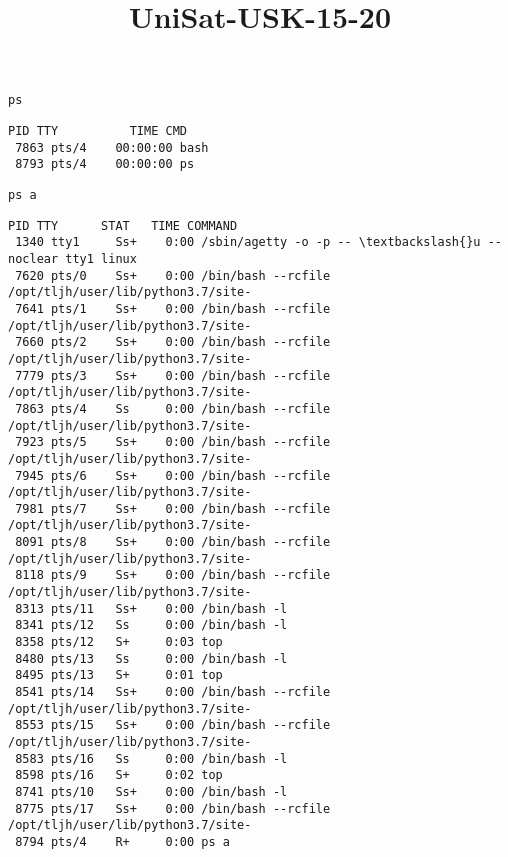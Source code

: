 \documentclass[11pt]{article}
\title{UniSat-USK-15-20}
\makeatletter
\newcommand{\boxspacing}{\kern\kvtcb@left@rule\kern\kvtcb@boxsep}
\newcommand{\prompt}[4]{
        \ttfamily\llap{{\color{#2}[#3]:\hspace{3pt}#4}}\vspace{-\baselineskip}
    }
\makeatother
\begin{document}
    
    \maketitle
    
    

    
    \begin{tcolorbox}[breakable, size=fbox, boxrule=1pt, pad at break*=1mm,colback=cellbackground, colframe=cellborder]
\prompt{In}{incolor}{2}{\boxspacing}
\begin{Verbatim}[commandchars=\\\{\}]
ps
\end{Verbatim}
\end{tcolorbox}

    \begin{Verbatim}[commandchars=\\\{\}]
  PID TTY          TIME CMD
 7863 pts/4    00:00:00 bash
 8793 pts/4    00:00:00 ps
    \end{Verbatim}

    \begin{tcolorbox}[breakable, size=fbox, boxrule=1pt, pad at break*=1mm,colback=cellbackground, colframe=cellborder]
\prompt{In}{incolor}{3}{\boxspacing}
\begin{Verbatim}[commandchars=\\\{\}]
ps a
\end{Verbatim}
\end{tcolorbox}

    \begin{Verbatim}[commandchars=\\\{\}]
  PID TTY      STAT   TIME COMMAND
 1340 tty1     Ss+    0:00 /sbin/agetty -o -p -- \textbackslash{}u --noclear tty1 linux
 7620 pts/0    Ss+    0:00 /bin/bash --rcfile /opt/tljh/user/lib/python3.7/site-
 7641 pts/1    Ss+    0:00 /bin/bash --rcfile /opt/tljh/user/lib/python3.7/site-
 7660 pts/2    Ss+    0:00 /bin/bash --rcfile /opt/tljh/user/lib/python3.7/site-
 7779 pts/3    Ss+    0:00 /bin/bash --rcfile /opt/tljh/user/lib/python3.7/site-
 7863 pts/4    Ss     0:00 /bin/bash --rcfile /opt/tljh/user/lib/python3.7/site-
 7923 pts/5    Ss+    0:00 /bin/bash --rcfile /opt/tljh/user/lib/python3.7/site-
 7945 pts/6    Ss+    0:00 /bin/bash --rcfile /opt/tljh/user/lib/python3.7/site-
 7981 pts/7    Ss+    0:00 /bin/bash --rcfile /opt/tljh/user/lib/python3.7/site-
 8091 pts/8    Ss+    0:00 /bin/bash --rcfile /opt/tljh/user/lib/python3.7/site-
 8118 pts/9    Ss+    0:00 /bin/bash --rcfile /opt/tljh/user/lib/python3.7/site-
 8313 pts/11   Ss+    0:00 /bin/bash -l
 8341 pts/12   Ss     0:00 /bin/bash -l
 8358 pts/12   S+     0:03 top
 8480 pts/13   Ss     0:00 /bin/bash -l
 8495 pts/13   S+     0:01 top
 8541 pts/14   Ss+    0:00 /bin/bash --rcfile /opt/tljh/user/lib/python3.7/site-
 8553 pts/15   Ss+    0:00 /bin/bash --rcfile /opt/tljh/user/lib/python3.7/site-
 8583 pts/16   Ss     0:00 /bin/bash -l
 8598 pts/16   S+     0:02 top
 8741 pts/10   Ss+    0:00 /bin/bash -l
 8775 pts/17   Ss+    0:00 /bin/bash --rcfile /opt/tljh/user/lib/python3.7/site-
 8794 pts/4    R+     0:00 ps a
    \end{Verbatim}
\end{document}
